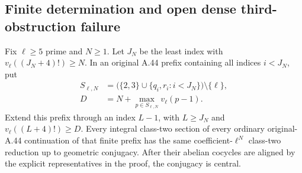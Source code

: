 \subsection{Finite determination and open dense third-obstruction failure}
\label{sec:ghost-prefix-topology}

\begin{lemma}
\label{lem:ghost-finite-prefix-determines}
Fix \(\ell\ge5\) prime and \(N\ge1\). Let
\(J_N\) be the least index with
\(v_\ell((J_N+4)!)\ge N\). In an original A.44
prefix containing all indices \(i<J_N\), put
\[
 \begin{split}
 S_{\ell,N}&=\bigl(\{2,3\}\cup
             \{q_i,r_i:i<J_N\}\bigr)\setminus\{\ell\},\\
 D&=N+\max_{p\in S_{\ell,N}}v_\ell(p-1).
 \end{split}                                         \tag{76}
\]
Extend this prefix through an index \(L-1\), with
\(L\ge J_N\) and \(v_\ell((L+4)!)\ge D\).
Every integral class-two section of every ordinary
original-A.44 continuation of that finite prefix
has the same coefficient-\(\ell^N\) class-two
reduction up to geometric conjugacy. After their
abelian cocycles are aligned by the explicit
representatives in the proof, the conjugacy is
central.
\end{lemma}
